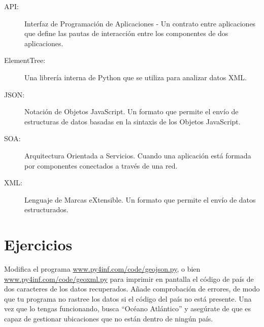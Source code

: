 \begin{description}

\item[API:] Interfaz de Programación de Aplicaciones - Un contrato entre
aplicaciones que define las pautas de interacción entre
los componentes de dos aplicaciones.

\item[ElementTree:] Una librería interna de Python que se utiliza
para analizar datos XML.

\item[JSON:] Notación de Objetos JavaScript. Un formato que permite
el envío de estructuras de datos basadas en la sintaxis de los Objetos
JavaScript.

\item[SOA:] Arquitectura Orientada a Servicios. Cuando una aplicación
está formada por componentes conectados a través de una red.

\item[XML:] Lenguaje de Marcas eXtensible. Un formato que permite
el envío de datos estructurados.

\end{description}

\section{Ejercicios}

\begin{ex}
Modifica el programa
\url{www.py4inf.com/code/geojson.py}, o bien
\url{www.py4inf.com/code/geoxml.py} para imprimir en pantalla el
código de país de dos caracteres de los datos recuperados.
Añade comprobación de errores, de modo que tu programa no rastree los datos
si el código del país no está presente. Una vez que lo tengas
funcionando, busca ``Océano Atlántico'' y asegúrate
de que es capaz de gestionar ubicaciones que no están dentro de ningún país.
\end{ex}
